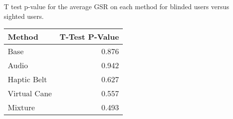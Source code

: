 
\centering
\caption{T test p-value for the average GSR on each method for blinded users versus sighted users.}
\label{tab:ttest_gsr}
\begin{tabular}{lr}
\toprule
      Method &  T-Test P-Value \\
\midrule
        Base &           0.876 \\
       Audio &           0.942 \\
 Haptic Belt &           0.627 \\
Virtual Cane &           0.557 \\
     Mixture &           0.493 \\
\bottomrule
\end{tabular}

